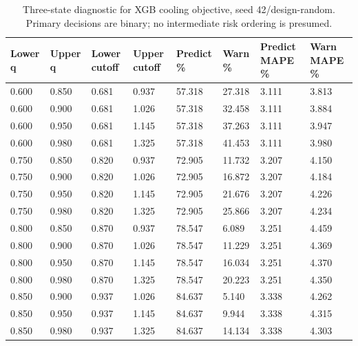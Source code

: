 \begin{table}[htbp]\centering\small\setlength{\tabcolsep}{3pt}\begin{tabular}{llllllll}
\toprule
Lower q & Upper q & Lower cutoff & Upper cutoff & Predict \% & Warn \% & Predict MAPE \% & Warn MAPE \%\\\midrule
0.600 & 0.850 & 0.681 & 0.937 & 57.318 & 27.318 & 3.111 & 3.813\\
0.600 & 0.900 & 0.681 & 1.026 & 57.318 & 32.458 & 3.111 & 3.884\\
0.600 & 0.950 & 0.681 & 1.145 & 57.318 & 37.263 & 3.111 & 3.947\\
0.600 & 0.980 & 0.681 & 1.325 & 57.318 & 41.453 & 3.111 & 3.980\\
0.750 & 0.850 & 0.820 & 0.937 & 72.905 & 11.732 & 3.207 & 4.150\\
0.750 & 0.900 & 0.820 & 1.026 & 72.905 & 16.872 & 3.207 & 4.184\\
0.750 & 0.950 & 0.820 & 1.145 & 72.905 & 21.676 & 3.207 & 4.226\\
0.750 & 0.980 & 0.820 & 1.325 & 72.905 & 25.866 & 3.207 & 4.234\\
0.800 & 0.850 & 0.870 & 0.937 & 78.547 & 6.089 & 3.251 & 4.459\\
0.800 & 0.900 & 0.870 & 1.026 & 78.547 & 11.229 & 3.251 & 4.369\\
0.800 & 0.950 & 0.870 & 1.145 & 78.547 & 16.034 & 3.251 & 4.370\\
0.800 & 0.980 & 0.870 & 1.325 & 78.547 & 20.223 & 3.251 & 4.350\\
0.850 & 0.900 & 0.937 & 1.026 & 84.637 & 5.140 & 3.338 & 4.262\\
0.850 & 0.950 & 0.937 & 1.145 & 84.637 & 9.944 & 3.338 & 4.315\\
0.850 & 0.980 & 0.937 & 1.325 & 84.637 & 14.134 & 3.338 & 4.303\\
\bottomrule\end{tabular}\caption{Three-state diagnostic for XGB cooling objective, seed 42/design-random. Primary decisions are binary; no intermediate risk ordering is presumed.}\label{tab:ubend-sensitivity}\end{table}
